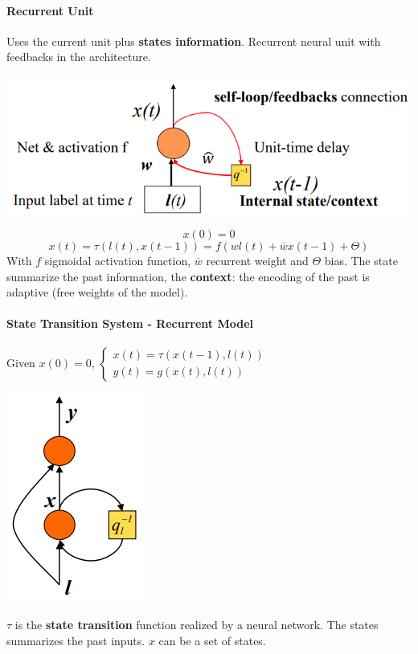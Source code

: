 \documentclass[10pt]{report}
\begin{document}
\paragraph{Recurrent Unit} Uses the current unit plus \textbf{states information}. Recurrent neural unit with feedbacks in the architecture.
\begin{center}
	\includegraphics[scale=0.5]{35.png}
\end{center}
$$x(0) = 0$$
$$x(t) = \tau(l(t),x(t-1)) = f(wl(t) + \overline{w}x(t-1) + \Theta)$$
With $f$ sigmoidal activation function, $\overline{w}$ recurrent weight and $\Theta$ bias. The state summarize the past information, the \textbf{context}: the encoding of the past is adaptive (free weights of the model).
\paragraph{State Transition System - Recurrent Model} Given $x(0) = 0$, $\left\{\begin{array}{l}
x(t) = \tau(x(t-1),l(t))\\
y(t) = g(x(t), l(t))
\end{array}\right.$
\begin{center}
	\includegraphics[scale=0.5]{36.png}
\end{center}
$\tau$ is the \textbf{state transition} function realized by a neural network. The states summarizes the past inputs. $x$ can be a set of states.
\end{document}
